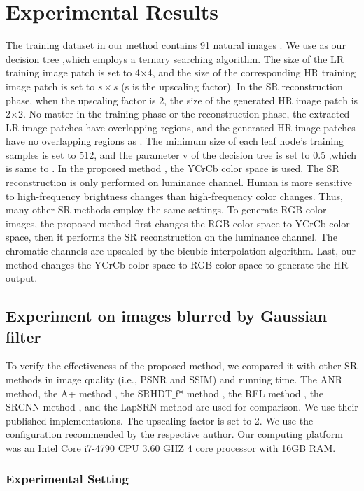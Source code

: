 \documentclass[review,numbers,sort&compress]{elsarticle}  %
\begin{document}
\section{Experimental Results}
The training dataset in our method contains 91 natural images \cite{yang2010image} . We use \cite{LUO2018315} as our decision tree ,which employs a ternary searching algorithm. The size of the LR training image patch is set to 4×4, and the size of the corresponding HR training image patch is set to $s×s$ (s is the upscaling factor). In the SR reconstruction phase, when the upscaling factor is 2, the size of the generated HR image patch is 2×2. No matter in the training phase or the reconstruction phase, the extracted LR image patches have overlapping regions, and the generated HR image patches have no overlapping regions as \cite{LUO2018315}. The minimum size of each leaf node’s training samples is set to 512, and the parameter v of the decision tree is set to 0.5 ,which is same to \cite{LUO2018315}. In the proposed method , the YCrCb color space is used. The SR reconstruction is only performed on luminance channel. Human is more sensitive to high-frequency brightness changes than high-frequency color changes. Thus, many other SR methods employ the same settings. To generate RGB color images, the proposed method first changes the RGB color space to YCrCb color space, then it performs the SR reconstruction on the luminance channel. The chromatic channels are upscaled by the bicubic interpolation algorithm. Last, our method changes the YCrCb color space to RGB color space to generate the HR output.
\subsection{Experiment on images blurred by Gaussian filter}
To verify the effectiveness of the proposed method, we compared it with other SR methods in image quality (i.e., PSNR and SSIM) and running time. The ANR method\cite{timofte2013anchored}, the A+ method \cite{timofte2014a+}, the SRHDT$\_$f* method \cite{huang2017learning}, the RFL method \cite{schulter2015fast}, the SRCNN method \cite{dong2016image}, and the LapSRN method \cite{lai2017deep} are used for comparison. We use their published implementations. The upscaling factor is set to 2. We use the configuration recommended by the respective author. Our computing platform was an Intel Core i7-4790 CPU 3.60 GHZ 4 core processor with 16GB RAM.
\subsubsection{Experimental Setting}
\end{document}
